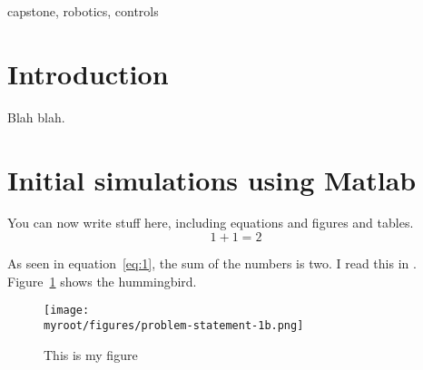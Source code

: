 \documentclass[onecolumn,10pt]{IEEEtran}
\newcommand{\myroot}{../}
\newcommand{\MATLAB}{Matlab}
\begin{document}
\begin{IEEEkeywords}
capstone, robotics, controls
\end{IEEEkeywords}

\section{Introduction}
Blah blah. 


\section{Initial simulations using \MATLAB}
You can now write stuff here, including equations and figures and tables.
\begin{equation}
1+1 = 2
\label{eq:1}
\end{equation}

As seen in equation~\ref{eq:1}, the sum of the numbers is two. I read this in \cite{clark2009courtship}. Figure~\ref{fig:otto} shows the hummingbird.

\begin{figure}
\begin{center}
\texttt{[image: \\myroot/figures/problem-statement-1b.png]}
\end{center}
\caption{This is my figure}
\label{fig:otto}
\end{figure}



\end{document}
